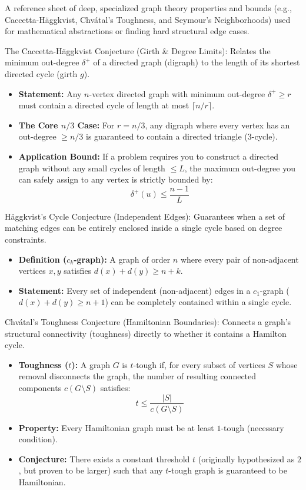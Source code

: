 
A reference sheet of deep, specialized graph theory properties and bounds (e.g., Caccetta-Häggkvist, Chvátal's Toughness, and Seymour's Neighborhoods) used for mathematical abstractions or finding hard structural edge cases.

The Caccetta-Häggkvist Conjecture (Girth \& Degree Limits):
Relates the minimum out-degree $\delta^+$ of a directed graph (digraph) to the length of its shortest directed cycle (girth $g$).
\begin{itemize}
    \item \textbf{Statement:} Any $n$-vertex directed graph with minimum out-degree $\delta^+ \ge r$ must contain a directed cycle of length at most $\lceil n/r \rceil$.
    \item \textbf{The Core $n/3$ Case:} For $r = n/3$, any digraph where every vertex has an out-degree $\ge n/3$ is guaranteed to contain a directed triangle ($3$-cycle).
    \item \textbf{Application Bound:} If a problem requires you to construct a directed graph without any small cycles of length $\le L$, the maximum out-degree you can safely assign to any vertex is strictly bounded by:
    $$\delta^+(u) \le \frac{n - 1}{L}$$
\end{itemize}

Häggkvist's Cycle Conjecture (Independent Edges):
Guarantees when a set of matching edges can be entirely enclosed inside a single cycle based on degree constraints.
\begin{itemize}
    \item \textbf{Definition ($c_k$-graph):} A graph of order $n$ where every pair of non-adjacent vertices $x, y$ satisfies $d(x) + d(y) \ge n + k$.
    \item \textbf{Statement:} Every set of independent (non-adjacent) edges in a $c_1$-graph ($d(x) + d(y) \ge n + 1$) can be completely contained within a single cycle.
\end{itemize}

Chvátal's Toughness Conjecture (Hamiltonian Boundaries):
Connects a graph's structural connectivity (toughness) directly to whether it contains a Hamilton cycle.
\begin{itemize}
    \item \textbf{Toughness ($t$):} A graph $G$ is $t$-tough if, for every subset of vertices $S$ whose removal disconnects the graph, the number of resulting connected components $c(G \setminus S)$ satisfies:
    $$t \le \frac{|S|}{c(G \setminus S)}$$
    \item \textbf{Property:} Every Hamiltonian graph must be at least $1$-tough (necessary condition).
    \item \textbf{Conjecture:} There exists a constant threshold $t$ (originally hypothesized as $2$, but proven to be larger) such that any $t$-tough graph is guaranteed to be Hamiltonian.
\end{itemize}

